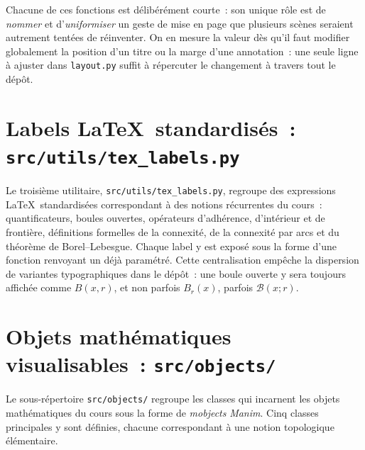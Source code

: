 \documentclass[12pt, a4paper, openany]{report}
\begin{document}
	Chacune de ces fonctions est délibérément courte~: son unique rôle est de \emph{nommer} et d’\emph{uniformiser} un geste de mise en page que plusieurs scènes seraient autrement tentées de réinventer. On en mesure la valeur dès qu’il faut modifier globalement la position d’un titre ou la marge d’une annotation~: une seule ligne à ajuster dans \texttt{layout.py} suffit à répercuter le changement à travers tout le dépôt.

	\section{Labels \LaTeX\ standardisés~: \texttt{src/utils/tex\_labels.py}}

	Le troisième utilitaire, \texttt{src/utils/tex\_labels.py}, regroupe des expressions \LaTeX\ standardisées correspondant à des notions récurrentes du cours~: quantificateurs, boules ouvertes, opérateurs d’adhérence, d’intérieur et de frontière, définitions formelles de la connexité, de la connexité par arcs et du théorème de Borel--Lebesgue. Chaque label y est exposé sous la forme d’une fonction renvoyant un  déjà paramétré. Cette centralisation empêche la dispersion de variantes typographiques dans le dépôt~: une boule ouverte y sera toujours affichée comme $B(x,r)$, et non parfois $B_r(x)$, parfois $\mathcal{B}(x;r)$.

	\section{Objets mathématiques visualisables~: \texttt{src/objects/}}

	Le sous-répertoire \texttt{src/objects/} regroupe les classes qui incarnent les objets mathématiques du cours sous la forme de \emph{mobjects} \textit{Manim}. Cinq classes principales y sont définies, chacune correspondant à une notion topologique élémentaire.
\end{document}

